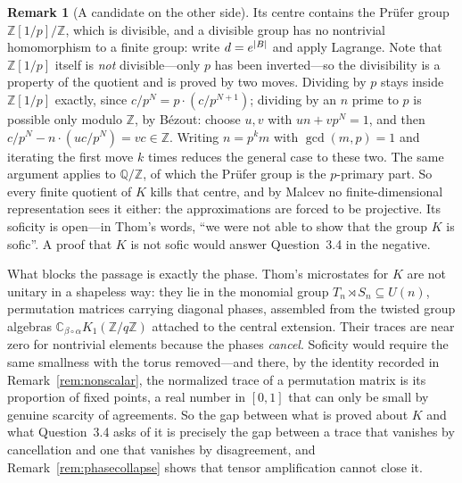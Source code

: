 \documentclass[11pt]{amsart}
\theoremstyle{definition}
\newtheorem{remark}[theorem]{Remark}
\theoremstyle{plain}
\newcommand{\Z}{\mathbb Z}
\newcommand{\Q}{\mathbb Q}
\DeclarePairedDelimiter{\abs}{\lvert}{\rvert}
\begin{document}
\begin{remark}[A candidate on the other side]
Its centre contains the Pr\"ufer group \(\Z[1/p]/\Z\), which is divisible, and a divisible group has no nontrivial homomorphism to a finite group: write \(d=e^{\abs B}\) and apply Lagrange.  Note that \(\Z[1/p]\) itself is \emph{not} divisible---only \(p\) has been inverted---so the divisibility is a property of the quotient and is proved by two moves.  Dividing by \(p\) stays inside \(\Z[1/p]\) exactly, since \(c/p^N=p\cdot(c/p^{N+1})\); dividing by an \(n\) prime to \(p\) is possible only modulo \(\Z\), by B\'ezout: choose \(u,v\) with \(un+vp^N=1\), and then \(c/p^N-n\cdot(uc/p^N)=vc\in\Z\).  Writing \(n=p^k m\) with \(\gcd(m,p)=1\) and iterating the first move \(k\) times reduces the general case to these two.  The same argument applies to \(\Q/\Z\), of which the Pr\"ufer group is the \(p\)-primary part.  So every finite quotient of \(K\) kills that centre, and by Malcev no finite-dimensional representation sees it either: the approximations are forced to be projective.  Its soficity is open---in Thom's words, ``we were not able to show that the group \(K\) is sofic''.  A proof that \(K\) is not sofic would answer Question~3.4 in the negative.

What blocks the passage is exactly the phase.  Thom's microstates for \(K\) are not unitary in a shapeless way: they lie in the monomial group \(T_n\rtimes S_n\subseteq U(n)\), permutation matrices carrying diagonal phases, assembled from the twisted group algebras \(\mathbb{C}_{\beta\circ\alpha}K_1(\Z/q\Z)\) attached to the central extension.  Their traces are near zero for nontrivial elements because the phases \emph{cancel}.  Soficity would require the same smallness with the torus removed---and there, by the identity recorded in Remark~\ref{rem:nonscalar}, the normalized trace of a permutation matrix is its proportion of fixed points, a real number in \([0,1]\) that can only be small by genuine scarcity of agreements.  So the gap between what is proved about \(K\) and what Question~3.4 asks of it is precisely the gap between a trace that vanishes by cancellation and one that vanishes by disagreement, and Remark~\ref{rem:phasecollapse} shows that tensor amplification cannot close it.


\end{remark}
\end{document}
